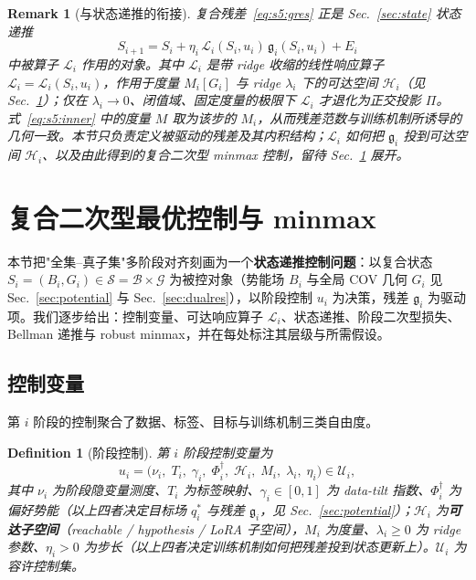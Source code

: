 \documentclass[11pt,a4paper]{article}
\newtheorem{definition}[theorem]{Definition}
\newtheorem{remark}[theorem]{Remark}
\newcommand{\cH}{\mathcal{H}}   %
\newcommand{\cL}{\mathcal{L}}   %
\newcommand{\cS}{\mathcal{S}}   %
\newcommand{\cG}{\mathcal{G}}   %
\newcommand{\cB}{\mathcal{B}}   %
\newcommand{\cU}{\mathcal{U}}   %
\newcommand{\ProjectOp}{\Pi}        %
\newcommand{\gres}{\bm{\mathfrak{g}}} %
\begin{document}
\begin{remark}[与状态递推的衔接]\label{rem:s5:recur}
复合残差~\eqref{eq:s5:gres} 正是 Sec.~\ref{sec:state} 状态递推
\begin{equation}\label{eq:s5:recur}
S_{i+1}=S_i+\eta_i\,\cL_i(S_i,u_i)\,\gres_i(S_i,u_i)+E_i
\end{equation}
中被算子 $\cL_i$ 作用的对象。其中 $\cL_i$ 是带 ridge 收缩的线性响应算子 $\cL_i=\cL_i(S_i,u_i)$，作用于度量 $M_i[G_i]$ 与 ridge $\lambda_i$ 下的可达空间 $\cH_i$（见 Sec.~\ref{sec:control}）；仅在 $\lambda_i\to0$、闭值域、固定度量的极限下 $\cL_i$ 才退化为正交投影 $\ProjectOp$。式~\eqref{eq:s5:inner} 中的度量 $M$ 取为该步的 $M_i$，从而残差范数与训练机制所诱导的几何一致。本节只负责定义被驱动的残差及其内积结构；$\cL_i$ 如何把 $\gres_i$ 投到可达空间 $\cH_i$、以及由此得到的复合二次型 minmax 控制，留待 Sec.~\ref{sec:control} 展开。
\end{remark}

\section{复合二次型最优控制与 minmax}\label{sec:control}

本节把"全集--真子集"多阶段对齐刻画为一个\textbf{状态递推控制问题}：以复合状态 $S_i=(B_i,G_i)\in\cS=\cB\times\cG$ 为被控对象（势能场 $B_i$ 与全局 COV 几何 $G_i$ 见 Sec.~\ref{sec:potential} 与 Sec.~\ref{sec:dualres}），以阶段控制 $u_i$ 为决策，残差 $\gres_i$ 为驱动项。我们逐步给出：控制变量、可达响应算子 $\cL_i$、状态递推、阶段二次型损失、Bellman 递推与 robust minmax，并在每处标注其层级与所需假设。

\subsection{控制变量}

第 $i$ 阶段的控制聚合了数据、标签、目标与训练机制三类自由度。

\begin{definition}[阶段控制]\label{def:s6:control}
第 $i$ 阶段控制变量为
\begin{equation}\label{eq:s6:control}
u_i=\bigl(\nu_i,\;T_i,\;\gamma_i,\;\Phi_i^\dagger,\;\cH_i,\;M_i,\;\lambda_i,\;\eta_i\bigr)\in\cU_i,
\end{equation}
其中 $\nu_i$ 为阶段隐变量测度、$T_i$ 为标签映射、$\gamma_i\in[0,1]$ 为 data-tilt 指数、$\Phi_i^\dagger$ 为偏好势能（以上四者决定目标场 $q_i^*$ 与残差 $\gres_i$，见 Sec.~\ref{sec:potential}）；$\cH_i$ 为\textbf{可达子空间}（reachable / hypothesis / LoRA 子空间），$M_i$ 为度量、$\lambda_i\ge 0$ 为 ridge 参数、$\eta_i>0$ 为步长（以上四者决定训练机制如何把残差投到状态更新上）。$\cU_i$ 为容许控制集。
\end{definition}
\end{document}
